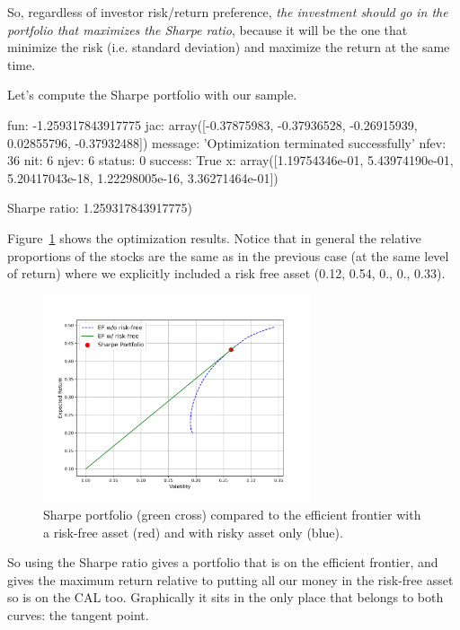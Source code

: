 So, regardless of investor risk/return preference, \emph{the investment should go in the portfolio that maximizes the Sharpe ratio}, because it will be the one that minimize the risk (i.e. standard deviation) and maximize the return at the same time.

Let's compute the Sharpe portfolio with our sample.


\begin{ioutput}
     fun: -1.259317843917775
     jac: array([-0.37875983, -0.37936528, -0.26915939,  0.02855796, -0.37932488])
 message: 'Optimization terminated successfully'
    nfev: 36
     nit: 6
    njev: 6
  status: 0
 success: True
       x: array([1.19754346e-01, 5.43974190e-01, 5.20417043e-18, 1.22298005e-16,
                 3.36271464e-01])

Sharpe ratio:  1.259317843917775)
\end{ioutput}

Figure~\ref{fig:sharpe_ratio} shows the optimization results. Notice that in general the relative proportions of the stocks are the same as in the previous case (at the same level of return) where we explicitly included a risk free asset (0.12, 0.54, 0., 0., 0.33).

\begin{figure}[htb]
\centering
\includegraphics[width=0.7\textwidth]{figures/sharpe_ratio}
\caption{Sharpe portfolio (green cross) compared to the efficient frontier with a risk-free asset (red) and with risky asset only (blue).}
\label{fig:sharpe_ratio}
\end{figure}

So using the Sharpe ratio gives a portfolio that is on the efficient frontier, and gives the maximum return relative to putting all our money in the risk-free asset so is on the CAL too. Graphically it sits in the only place that belongs to both curves: the tangent point.

